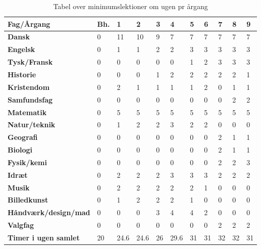\begin{table}[h!]
\centering
\begin{tabular}{|l|l|l|l|l|l|l|l|l|l|l|}
\hline
\textbf{Fag/Årgang}                 & \textbf{Bh.} & \textbf{1} & \textbf{2} & \textbf{3} & \textbf{4} & \textbf{5} & \textbf{6} & \textbf{7} & \textbf{8} & \textbf{9} \\ \hline
\textbf{Dansk}                      & 0   & 11   & 10   & 9    & 7    & 7    & 7    & 7    & 7    & 7    \\ \hline
\textbf{Engelsk}                    & 0   & 1    & 1    & 2    & 2    & 3    & 3    & 3    & 3    & 3    \\ \hline
\textbf{Tysk/Fransk}                & 0   & 0    & 0    & 0    & 0    & 1    & 2    & 3    & 3    & 3    \\ \hline
\textbf{Historie}                   & 0   & 0    & 0    & 1    & 2    & 2    & 2    & 2    & 2    & 1    \\ \hline
\textbf{Kristendom}                 & 0   & 2    & 1    & 1    & 1    & 1    & 2    & 0    & 1    & 1    \\ \hline
\textbf{Samfundsfag}                & 0   & 0    & 0    & 0    & 0    & 0    & 0    & 0    & 2    & 2    \\ \hline
\textbf{Matematik}                  & 0   & 5    & 5    & 5    & 5    & 5    & 5    & 5    & 5    & 5    \\ \hline
\textbf{Natur/teknik}               & 0   & 1    & 2    & 2    & 3    & 2    & 2    & 0    & 0    & 0    \\ \hline
\textbf{Geografi}                   & 0   & 0    & 0    & 0    & 0    & 0    & 0    & 2    & 1    & 1    \\ \hline
\textbf{Biologi}                    & 0   & 0    & 0    & 0    & 0    & 0    & 0    & 2    & 1    & 1    \\ \hline
\textbf{Fysik/kemi}                 & 0   & 0    & 0    & 0    & 0    & 0    & 0    & 2    & 2    & 3    \\ \hline
\textbf{Idræt}                      & 0   & 2    & 2    & 2    & 3    & 3    & 3    & 2    & 2    & 2    \\ \hline
\textbf{Musik}                      & 0   & 2    & 2    & 2    & 2    & 2    & 1    & 0    & 0    & 0    \\ \hline
\textbf{Billedkunst}                & 0   & 1    & 2    & 2    & 2    & 1    & 0    & 0    & 0    & 0    \\ \hline
\textbf{Håndværk/design/mad} & 0   & 0    & 0    & 3    & 4    & 4    & 2    & 0    & 0    & 0    \\ \hline
\textbf{Valgfag}                    & 0   & 0    & 0    & 0    & 0    & 0    & 0    & 2    & 2    & 2    \\ \hline
\textbf{Timer i ugen samlet}        & 20  & 24.6 & 24.6 & 26   & 29.6 & 31   & 31   & 32   & 32   & 31   \\ \hline
\end{tabular}
\caption{Tabel over minimumslektioner om ugen pr årgang}
\label{tab:lektioner_pr_uge}
\end{table}

